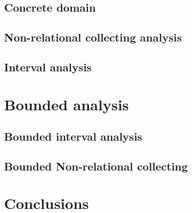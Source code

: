 \documentclass{beamer}
\begin{document}
\subsection{Concrete domain}
\subsection{Non-relational collecting analysis}
\subsection{Interval analysis}

\section{Bounded analysis}
\subsection{Bounded interval analysis}
\subsection{Bounded Non-relational collecting}

\section{Conclusions}
\end{document}
